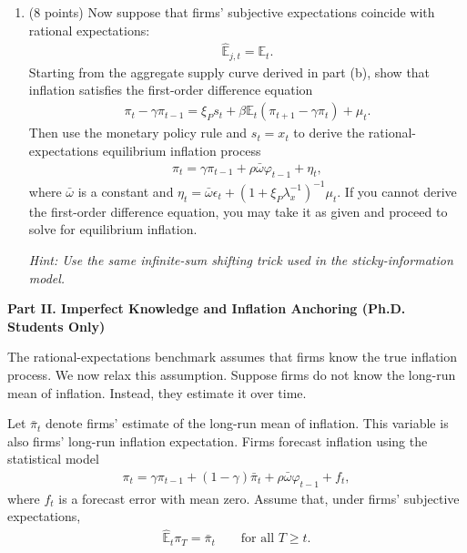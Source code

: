 \documentclass[12pt]{article}
\begin{document}
\begin{enumerate}[label=\arabic*.]
\begin{enumerate}[label=(\alph*)]
        \item (8 points)
        Now suppose that firms' subjective expectations coincide with rational expectations:
        \begin{align*}
            \hat{\mathbb{E}}_{j,t}=\mathbb{E}_t.
        \end{align*}
        Starting from the aggregate supply curve derived in part (b), show that inflation satisfies the first-order difference equation
        \begin{align*}
            \pi_t-\gamma\pi_{t-1}
            =
            \xi_P s_t
            +
            \beta\mathbb{E}_t(\pi_{t+1}-\gamma\pi_t)
            +
            \mu_t.
        \end{align*}
        Then use the monetary policy rule and $s_t=x_t$ to derive the rational-expectations equilibrium inflation process
        \begin{align*}
            \pi_t
            =
            \gamma\pi_{t-1}
            +
            \rho\bar{\omega}\varphi_{t-1}
            +
            \eta_t,
        \end{align*}
        where $\bar{\omega}$ is a constant and $\eta_t = \bar{\omega}\epsilon_t + (1+\xi_P\lambda_x^{-1})^{-1}\mu_t$.
        If you cannot derive the first-order difference equation, you may take it as given and proceed to solve for equilibrium inflation.
    
        \textit{Hint: Use the same infinite-sum shifting trick used in the sticky-information model.}
    \end{enumerate}

    \textbf{Part II. Imperfect Knowledge and Inflation Anchoring (Ph.D. Students Only)}

    The rational-expectations benchmark assumes that firms know the true inflation process. We now relax this assumption. Suppose firms do not know the long-run mean of inflation. Instead, they estimate it over time.

    Let $\bar{\pi}_t$ denote firms' estimate of the long-run mean of inflation. This variable is also firms' long-run inflation expectation. Firms forecast inflation using the statistical model
    \begin{align*}
        \pi_t
        =
        \gamma\pi_{t-1}
        +
        (1-\gamma)\bar{\pi}_t
        +
        \rho\bar{\omega}\varphi_{t-1}
        +
        f_t,
    \end{align*}
    where $f_t$ is a forecast error with mean zero. Assume that, under firms' subjective expectations,
    \begin{align*}
        \hat{\mathbb{E}}_t\pi_T=\bar{\pi}_t
        \qquad
        \text{for all } T\geq t.
    \end{align*}
    

\end{enumerate}
\end{document}
